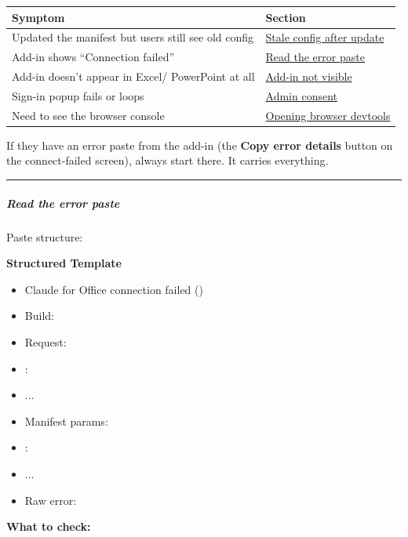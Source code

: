 \documentclass[11pt]{article}
\begin{document}
\begingroup
\small
\setlength{\tabcolsep}{2pt}
\begin{longtable}{>{\RaggedRight\arraybackslash\hspace{0pt}}p{}>{\RaggedRight\arraybackslash\hspace{0pt}}p{}}
\toprule
{} \textbf{Symptom} & \textbf{Section} \\
\midrule
{} Updated the manifest but users still see old config & \href{\#stale-config-after-update}{Stale config after update} \\
{} Add-in shows ``Connection failed'' & \href{\#read-the-error-paste}{Read the error paste} \\
{} Add-in doesn't appear in Excel/ PowerPoint at all & \href{\#add-in-not-visible}{Add-in not visible} \\
{} Sign-in popup fails or loops & \href{\#admin-consent}{Admin consent} \\
{} Need to see the browser console & \href{\#opening-browser-devtools-on-the-add-in}{Opening browser devtools} \\
\bottomrule
\end{longtable}
\endgroup

If they have an error paste from the add-in (the \textbf{Copy error details} button on the connect-failed screen), always start there. It carries everything.


\vspace{0.5em}\hrule\vspace{0.5em}

\subparagraph{Read the error paste}\mbox{}\par

Paste structure:


\textbf{Structured Template}
\begin{itemize}[leftmargin=*,itemsep=2pt,topsep=2pt]
\item {} Claude for Office connection failed ()
\item {} Build:
\item {} Request:
\item {} :
\item {} ...
\item {} Manifest params:
\item {} :
\item {} ...
\item {} Raw error:
\end{itemize}

\textbf{What to check:}
\end{document}
